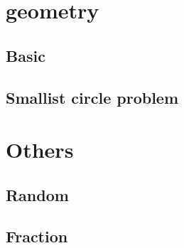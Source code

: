 \documentclass[12pt,twocolumn,oneside,a4paper]{article}
\begin{document}
\section{geometry}
\subsection{Basic}


\subsection{Smallist circle problem}


\section{Others}
\subsection{Random}


\subsection{Fraction}

\end{document}
